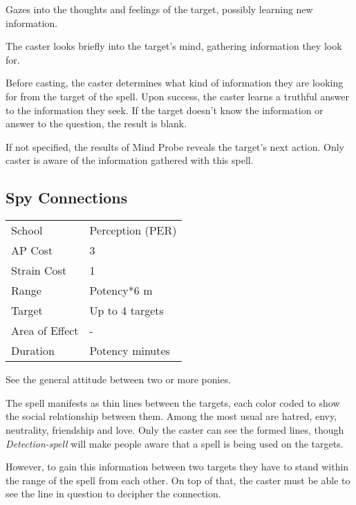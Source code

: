\documentclass[11pt,a4paper,twocolumn]{book}
\begin{document}
\medskip

Gazes into the thoughts and feelings of the target, possibly learning new information.

The caster looks briefly into the target's mind, gathering information they look for.

Before casting, the caster determines what kind of information they are looking for from the target of the spell. Upon success, the caster learns a truthful answer to the information they seek. If the target doesn't know the information or answer to the question, the result is blank.

If not specified, the results of Mind Probe reveals the target's next action. Only caster is aware of the information gathered with this spell.


\subsection*{Spy Connections}
{
	\begin{tabu} to 75mm{| X[l,4] | X[l,7] |}
		\hline
		School 			& Perception (PER) 		\\
		AP Cost	      	& 3 					\\
		Strain Cost     & 1 					\\
		Range     		& Potency*6 m			\\
		Target      	& Up to 4 targets		\\
		Area of Effect  & - 	 				\\
		Duration     	& Potency minutes		\\ \hline
	\end{tabu}
	
}

\medskip

See the general attitude between two or more ponies.

The spell manifests as thin lines between the targets, each color coded to show the social relationship between them. Among the most usual are hatred, envy, neutrality, friendship and love. Only the caster can see the formed lines, though \textit{Detection-spell} will make people aware that a spell is being used on the targets.

However, to gain this information between two targets they have to stand within the range of the spell from each other. On top of that, the caster must be able to see the line in question to decipher the connection.
\end{document}
